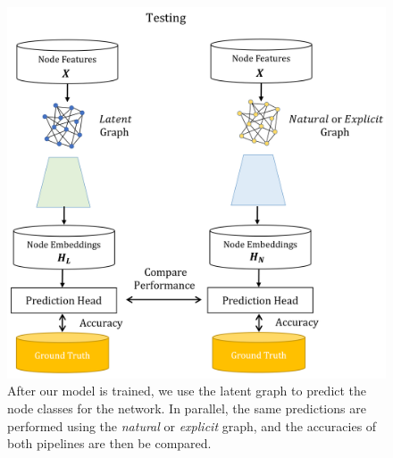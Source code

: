 \documentclass[12pt,a4paper]{article}
\begin{document}
	\begin{figure}[hbtp]
		\centering \includegraphics[scale=0.4]{eval_part3_1.png}
		\caption{After our model is trained, we use the latent graph to predict the node classes for the network. In parallel, the same predictions are performed using the \emph{natural} or \emph{explicit} graph, and the accuracies of both pipelines are then be compared. \label{eval3_1}}
	\end{figure}
	
\end{document}

